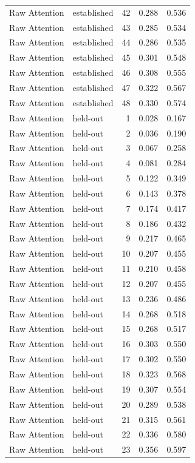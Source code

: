 \begin{tabular}{llrrr}
Raw Attention & established & 42 & 0.288 & 0.536 \\
Raw Attention & established & 43 & 0.285 & 0.534 \\
Raw Attention & established & 44 & 0.286 & 0.535 \\
Raw Attention & established & 45 & 0.301 & 0.548 \\
Raw Attention & established & 46 & 0.308 & 0.555 \\
Raw Attention & established & 47 & 0.322 & 0.567 \\
Raw Attention & established & 48 & 0.330 & 0.574 \\
Raw Attention & held-out & 1 & 0.028 & 0.167 \\
Raw Attention & held-out & 2 & 0.036 & 0.190 \\
Raw Attention & held-out & 3 & 0.067 & 0.258 \\
Raw Attention & held-out & 4 & 0.081 & 0.284 \\
Raw Attention & held-out & 5 & 0.122 & 0.349 \\
Raw Attention & held-out & 6 & 0.143 & 0.378 \\
Raw Attention & held-out & 7 & 0.174 & 0.417 \\
Raw Attention & held-out & 8 & 0.186 & 0.432 \\
Raw Attention & held-out & 9 & 0.217 & 0.465 \\
Raw Attention & held-out & 10 & 0.207 & 0.455 \\
Raw Attention & held-out & 11 & 0.210 & 0.458 \\
Raw Attention & held-out & 12 & 0.207 & 0.455 \\
Raw Attention & held-out & 13 & 0.236 & 0.486 \\
Raw Attention & held-out & 14 & 0.268 & 0.518 \\
Raw Attention & held-out & 15 & 0.268 & 0.517 \\
Raw Attention & held-out & 16 & 0.303 & 0.550 \\
Raw Attention & held-out & 17 & 0.302 & 0.550 \\
Raw Attention & held-out & 18 & 0.323 & 0.568 \\
Raw Attention & held-out & 19 & 0.307 & 0.554 \\
Raw Attention & held-out & 20 & 0.289 & 0.538 \\
Raw Attention & held-out & 21 & 0.315 & 0.561 \\
Raw Attention & held-out & 22 & 0.336 & 0.580 \\
Raw Attention & held-out & 23 & 0.356 & 0.597 \\

\end{tabular}
